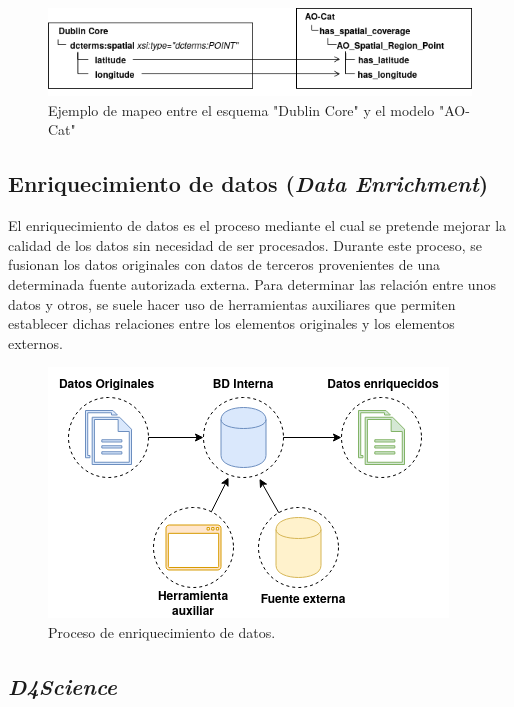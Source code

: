 \documentclass[
]{article}
\begin{document}
\begin{figure}
\hypertarget{mapping}{%
\centering
\includegraphics{../_static/images/mapping.png}
\caption{Ejemplo de mapeo entre el esquema "Dublin Core" y el modelo
"AO-Cat"}\label{mapping}
}
\end{figure}

\hypertarget{enriquecimiento-de-datos-data-enrichment}{%
\subsection{\texorpdfstring{Enriquecimiento de datos (\emph{Data
Enrichment})}{Enriquecimiento de datos (Data Enrichment)}}\label{enriquecimiento-de-datos-data-enrichment}}

El enriquecimiento de datos es el proceso mediante el cual se pretende
mejorar la calidad de los datos sin necesidad de ser procesados. Durante
este proceso, se fusionan los datos originales con datos de terceros
provenientes de una determinada fuente autorizada externa. Para
determinar las relación entre unos datos y otros, se suele hacer uso de
herramientas auxiliares que permiten establecer dichas relaciones entre
los elementos originales y los elementos externos.

\begin{figure}
\hypertarget{enrichmentconcept}{%
\centering
\includegraphics{../_static/images/enrichmentconcept.png}
\caption{Proceso de enriquecimiento de datos.}\label{enrichmentconcept}
}
\end{figure}

\hypertarget{d4science}{%
\subsection{\texorpdfstring{\emph{D4Science}}{D4Science}}\label{d4science}}
\end{document}
